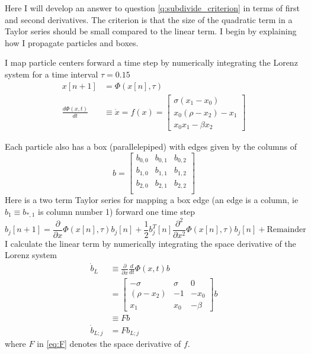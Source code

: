 \documentclass[12pt]{article}
\begin{document}
Here I will develop an answer to question \ref{q:subdivide_criterion}
in terms of first and second derivatives.  The criterion is that the
size of the quadratic term in a Taylor series should be small compared
to the linear term.  I begin by explaining how I propagate particles
and boxes.

I map particle centers forward a time step by numerically integrating
the Lorenz system for a time interval $\tau = 0.15$
\begin{align}
  x[n+1] &= \Phi(x[n],\tau) \\
  \frac{d \Phi(x,t)}{dt} &\equiv \dot x = f(x) =
                           \begin{bmatrix}
                             \sigma(x_1-x_0)\\
                             x_0(\rho-x_2) - x_1\\
                             x_0x_1 - \beta x_2
                           \end{bmatrix}
\end{align}

Each particle also has a box (parallelepiped) with edges given by the
columns of
\begin{equation*}
  b =
  \begin{bmatrix}
    b_{0,0} & b_{0,1} & b_{0,2} \\
    b_{1,0} & b_{1,1} & b_{1,2} \\
    b_{2,0} & b_{2,1} & b_{2,2} \\
  \end{bmatrix}
\end{equation*}
%
Here is a two term Taylor series for mapping a box edge (an edge is a
column, ie $b_1 \equiv b_{*,1}$ is column number 1) forward one time
step
\begin{equation}
  \label{eq:quadratic_phi}
  b_j[n+1] = \frac{\partial}{\partial x} \Phi(x[n], \tau) b_j[n] + \frac{1}{2} b_j^T[n]
  \frac{\partial^2}{\partial x^2} \Phi(x[n], \tau) b_j[n] + \text{Remainder}
\end{equation}
I calculate the linear term by numerically integrating the space
derivative of the Lorenz system
\begin{align}
  \label{eq:tangent}
  \dot b_L &\equiv \frac{\partial}{\partial x} \frac{d}{dt} \Phi(x,t) b
  \\
  \nonumber 
  &=
    \begin{bmatrix}
      -\sigma & \sigma & 0 \\
      (\rho - x_2) & -1 & -x_0 \\
      x_1 & x_0 & -\beta
    \end{bmatrix} b  \\
  \label{eq:F}
           & \equiv F b \\
  \nonumber
  \dot b_{L;j} &= F b_{L;j}
\end{align}
where $F$ in \eqref{eq:F} denotes the space derivative of $f$.
\end{document}

